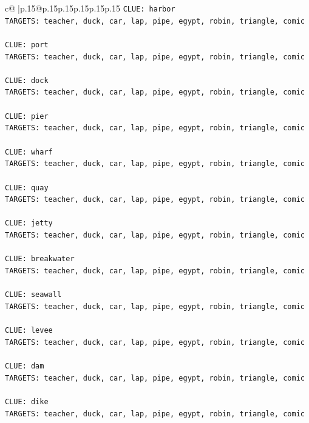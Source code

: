 \documentclass{article}
\begin{document}
{\begin{supertabular}{c@{$\;$}|p{.15\linewidth}@{}p{.15\linewidth}p{.15\linewidth}p{.15\linewidth}p{.15\linewidth}p{.15\linewidth}}
{{{\texttt{CLUE: harbor} \\
\texttt{TARGETS: teacher, duck, car, lap, pipe, egypt, robin, triangle, comic} \\
\\ 
\texttt{CLUE: port} \\
\texttt{TARGETS: teacher, duck, car, lap, pipe, egypt, robin, triangle, comic} \\
\\ 
\texttt{CLUE: dock} \\
\texttt{TARGETS: teacher, duck, car, lap, pipe, egypt, robin, triangle, comic} \\
\\ 
\texttt{CLUE: pier} \\
\texttt{TARGETS: teacher, duck, car, lap, pipe, egypt, robin, triangle, comic} \\
\\ 
\texttt{CLUE: wharf} \\
\texttt{TARGETS: teacher, duck, car, lap, pipe, egypt, robin, triangle, comic} \\
\\ 
\texttt{CLUE: quay} \\
\texttt{TARGETS: teacher, duck, car, lap, pipe, egypt, robin, triangle, comic} \\
\\ 
\texttt{CLUE: jetty} \\
\texttt{TARGETS: teacher, duck, car, lap, pipe, egypt, robin, triangle, comic} \\
\\ 
\texttt{CLUE: breakwater} \\
\texttt{TARGETS: teacher, duck, car, lap, pipe, egypt, robin, triangle, comic} \\
\\ 
\texttt{CLUE: seawall} \\
\texttt{TARGETS: teacher, duck, car, lap, pipe, egypt, robin, triangle, comic} \\
\\ 
\texttt{CLUE: levee} \\
\texttt{TARGETS: teacher, duck, car, lap, pipe, egypt, robin, triangle, comic} \\
\\ 
\texttt{CLUE: dam} \\
\texttt{TARGETS: teacher, duck, car, lap, pipe, egypt, robin, triangle, comic} \\
\\ 
\texttt{CLUE: dike} \\
\texttt{TARGETS: teacher, duck, car, lap, pipe, egypt, robin, triangle, comic} \\
}}}
\end{supertabular}}
\end{document}
